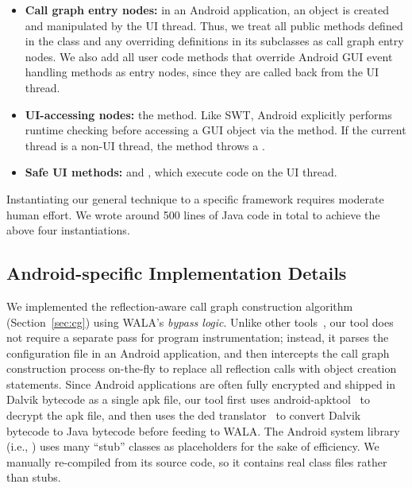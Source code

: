 \begin{myindentpar}{-2mm}
\begin{itemize}
\tinystep

\item \textbf{Call graph entry nodes:} in an Android application,
an  object is created and manipulated by the UI thread. Thus, we treat
all public methods defined in the  class 
and any overriding definitions in its subclasses as call graph entry nodes.
We also add all user code methods that override Android GUI event handling methods
as entry nodes, since they are called back from the UI thread.

\tinystep

\item \textbf{UI-accessing nodes:} the  method.
Like SWT, Android explicitly performs runtime checking before accessing
a GUI object via the  method. If the current
thread is a non-UI thread, the  method throws
a .

\tinystep

\item \textbf{Safe UI methods:}  
and , which execute code on the UI thread. 

\end{itemize}
\end{myindentpar}

\tinystep

Instantiating our general technique to  a specific framework
requires moderate human effort. We wrote around 500 lines of Java code in total to achieve
the above four instantiations.

\subsection{Android-specific Implementation Details}


We implemented the reflection-aware call graph construction
 algorithm (Section~\ref{sec:cg}) using WALA's \textit{bypass logic}.
Unlike other tools~\cite{Payet:2011:SAA:2032266.2032299}, our tool
does not require a separate pass for program instrumentation; instead, it
parses the configuration file in an Android application,
and then intercepts the call graph construction
process on-the-fly to replace all reflection calls with object creation statements.
Since Android applications are often fully encrypted and shipped in Dalvik
bytecode as a single apk file, our tool first uses
android-apktool~\cite{apktool} to
decrypt the apk file, and then uses the 
ded translator~\cite{ded} to convert
Dalvik bytecode to Java bytecode before feeding to WALA.  The Android system
library (i.e., ) uses many ``stub'' classes as
placeholders for the sake of efficiency. We manually re-compiled 
 from its source code, so it contains real
class files rather than stubs.
